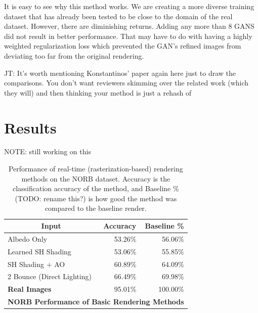 \documentclass[10pt,twocolumn,letterpaper]{article}
\newcommand{\tompson}[1]{{\color{green} JT: #1}}
\begin{document}
It is easy to see why this method works. We are creating a more diverse training dataset that has already been tested to be close to the domain of the real dataset.  However, there are diminishing returns.  Adding any more than 8 GANS did not result in better performance.  That may have to do with having a highly weighted regularization loss which prevented the GAN's refined images from deviating too far from the original rendering.  

\tompson{It's worth mentioning Konstantinos' paper again here just to draw the comparisons. You don't want reviewers skimming over the related work (which they will) and then thinking your method is just a rehash of }

\section{Results}
NOTE: still working on this
\begin{table}[]
\centering
\begin{tabular}{|l|r|r|}
\hline
\multicolumn{1}{|c|}{\textbf{Input}}
& \multicolumn{1}{r|}{\textbf{Accuracy}}
& \multicolumn{1}{r|}{\textbf{Baseline \%}} \\ \hline
Albedo Only 				&53.26\%	& 56.06\%	\\
Learned SH Shading			&53.06\%	& 55.85\%	\\
SH Shading + AO				&60.89\%    & 64.09\%   \\
2 Bounce (Direct Lighting)	&66.49\%	& 69.98\%   \\
\textbf{Real Images}		& 95.01\%	& 100.00\%	\\ \hline
\multicolumn{3}{|c|}{\textbf{NORB Performance of Basic Rendering Methods}}	\\ \hline
\end{tabular}

\caption{Performance of real-time (rasterization-based) rendering methods on the NORB dataset. Accuracy is the classification accuracy of the method, and Baseline \% (TODO: rename this?) is how good the method was compared to the baseline render.}
\label{table:tblnonGI}
\end{table}
\end{document}
